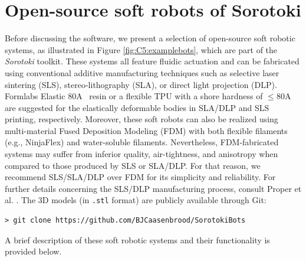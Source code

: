 \section{Open-source soft robots of Sorotoki}
Before discussing the software, we present a selection of open-source soft robotic systems, as illustrated in Figure \ref{fig:C5:examplebots}, which are part of the \textit{Sorotoki} toolkit. These systems all feature fluidic actuation and can be fabricated using conventional additive manufacturing techniques such as selective laser sintering (SLS), stereo-lithography (SLA), or direct light projection (DLP). Formlabs Elastic 80A\texttrademark
\, resin or a flexible TPU with a shore hardness of $\le 80$A are suggested for the elastically deformable bodies in SLA/DLP and SLS printing, respectively. Moreover, these soft robots can also be realized using multi-material Fused Deposition Modeling (FDM) with both flexible filaments (e.g., NinjaFlex) and water-soluble filaments. Nevertheless, FDM-fabricated systems may suffer from inferior quality, air-tightness, and anisotropy when compared to those produced by SLS or SLA/DLP. For that reason, we recommend SLS/SLA/DLP over FDM for its simplicity and reliability. For further details concerning the SLS/DLP manufacturing process, consult Proper et al. \cite{Proper2023}. The 3D models (in \texttt{.stl} format) are publicly available through Git:
%
\begin{lstlisting}[style=terminal]
> git clone https://github.com/BJCaasenbrood/SorotokiBots
\end{lstlisting}
%
A brief description of these soft robotic systems and their functionality is provided below.

